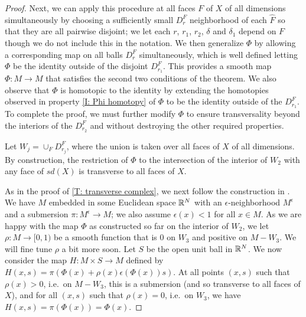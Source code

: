 \begin{proof}

	Next, we can apply this procedure at all faces $F$ of $X$ of all dimensions simultaneously by choosing a sufficiently small $D^F_r$ neighborhood of each $\hat F$ so that they are all pairwise disjoint; we let each $r$, $r_1$, $r_2$, $\delta$ and $\delta_1$ depend on $F$ though we do not include this in the notation.
	We then generalize $\Phi$ by allowing a corresponding map on all balls $D_r^F$ simultaneously, which is well defined letting $\Phi$ be the identity outside of the disjoint $D_{r_1}^F$.
	This provides a smooth map $\Phi \colon M \to M$ that satisfies the second two conditions of the theorem.
	We also observe that $\Phi$ is homotopic to the identity by extending the homotopies observed in property \eqref{I: Phi homotopy} of $\Phi$ to be the identity outside of the $D_{r_1}^F$.
	To complete the proof, we must further modify $\Phi$ to ensure transversality beyond the interiors of the $D_{r_2}^F$ and without destroying the other required properties.

	Let $W_j = \cup_F D^F_{r_j}$, where the union is taken over all faces of $X$ of all dimensions.
	By construction, the restriction of $\Phi$ to the intersection of the interior of $W_2$ with any face of $sd(X)$ is transverse to all faces of $X$.

	As in the proof of \cref{T: transverse complex}, we next follow the construction in \cite[Section 2.3]{GuPo74}.
	We have $M$ embedded in some Euclidean space $\mathbb{R}^N$ with an $\epsilon$-neighborhood $M^\epsilon$ and a submersion $\pi \colon M^\epsilon \to M$; we also assume $\epsilon(x)<1$ for all $x \in M$.
	As we are happy with the map $\Phi$ as constructed so far on the interior of $W_2$, we let $\rho \colon M \to [0,1)$ be a smooth function that is $0$ on $W_3$ and positive on $M-W_3$.
	We will fine tune $\rho$ a bit more soon.
	Let $S$ be the open unit ball in $\mathbb{R}^N$.
	We now consider the map $H \colon M \times S \to M$ defined by $H(x,s) = \pi(\Phi(x)+\rho(x)\epsilon(\Phi(x)) s)$.
	At all points $(x,s)$ such that $\rho(x)>0$, i.e.\ on $M-W_3$, this is a submersion (and so transverse to all faces of $X$), and for all $(x,s)$ such that $\rho(x) = 0$, i.e.\ on $W_3$, we have $H(x,s) = \pi(\Phi(x)) = \Phi(x)$.


\end{proof}
